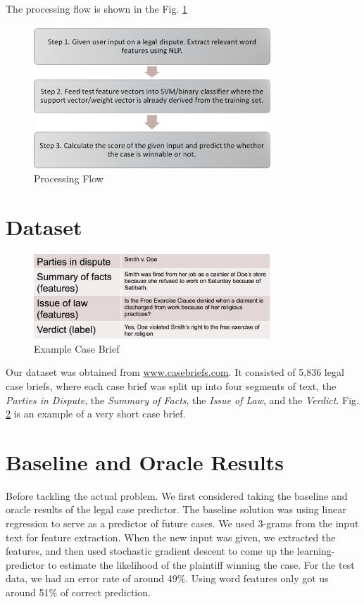\documentclass[journal]{IEEEtran}
\begin{document}
The processing flow is shown in the Fig. \ref{fig:ProcessingFlow}

\begin{figure}
    \centering
    \includegraphics[width=3.5in]{flow.png}
    \caption{Processing Flow}
    \label{fig:ProcessingFlow}
\end{figure}

\section{Dataset}

\begin{figure}
    \centering
    \includegraphics[width=3.5in]{exampleCaseBrief.jpg}
    \caption{Example Case Brief}
    \label{fig:ExampleCaseBrief}
\end{figure}

Our dataset was obtained from \url{www.casebriefs.com}. It consisted of 5,836 legal case briefs, where each case brief was split up into four segments of text, the \textit{Parties in Dispute}, the \textit{Summary of Facts}, the \textit{Issue of Law}, and the \textit{Verdict}. Fig. \ref{fig:ExampleCaseBrief} is  an example of a very short case brief.

\section{Baseline and Oracle Results}
Before tackling the actual problem. We first considered taking the baseline and oracle results of the legal case predictor. The baseline solution was using linear regression to serve as a predictor of future cases. We used 3-grams from the input text for feature extraction.  When the new input was given, we extracted the features, and then used stochastic gradient descent to come up the learning-predictor to estimate the likelihood of the plaintiff winning the case. For the test data, we had an error rate of around 49\%. Using word features only got us around 51\% of correct prediction.
\end{document}
